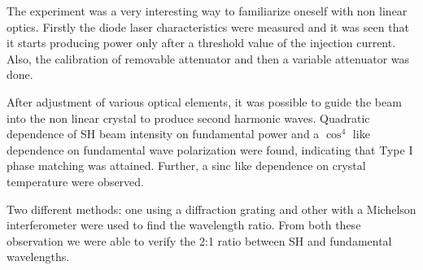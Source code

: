 The experiment was a very interesting way to familiarize oneself with non linear optics.
Firstly the diode laser characteristics were measured and it was seen that it starts producing power only after a threshold value of the injection current. Also, the calibration of removable attenuator and then a variable attenuator was done.

After adjustment of various optical elements, it was possible to guide the beam into the non linear crystal to produce second harmonic waves. Quadratic dependence of SH beam intensity on fundamental power and a $\cos^{4}$ like dependence on fundamental wave polarization were found, indicating that Type I phase matching was attained. Further, a sinc like dependence on crystal temperature were observed.

Two different methods: one using a diffraction grating and other with a Michelson interferometer were used to find the wavelength ratio. From both these observation we were able to verify the 2:1 ratio between SH and fundamental wavelengths.